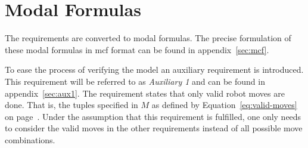 \section{Modal Formulas}\label{sec:modal_formulas}
The requirements are converted to modal formulas.
The precise formulation of these modal formulas in mcf format can be found in appendix~\ref{sec:mcf}.

To ease the process of verifying the model an auxiliary requirement is introduced.
This requirement will be referred to as \textit{Auxiliary 1} and can be found in appendix~\ref{sec:aux1}.
The requirement states that only valid robot moves are done.
That is, the tuples specified in $M$ as defined by Equation~\ref{eq:valid-moves} on page~\pageref{eq:valid-moves}.
Under the assumption that this requirement is fulfilled, one only needs to consider the valid moves in the other requirements instead of all possible move combinations.

